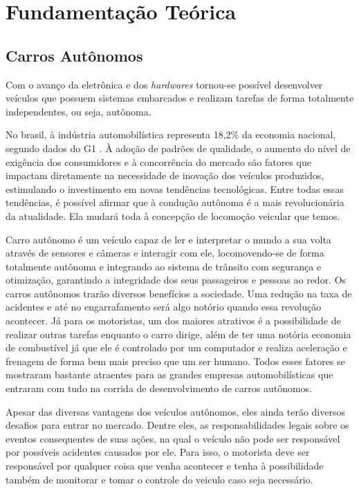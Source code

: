 \chapter{Fundamentação Teórica}
\label{cap:fundamentacao-teorica}

\section{Carros Autônomos}
\label{sec:carros autonomos}

Com o avanço da eletrônica e dos \textit{hardwares} tornou-se possível desenvolver veículos que possuem sistemas embarcados e realizam tarefas de forma totalmente independentes, ou seja, autônoma. \cite{rodrigues2017fundamentos}

No brasil, à indústria automobilística representa 18,2\% da economia nacional, segundo dados do G1 \cite{brasilutimorank}. À adoção de padrões de qualidade, o aumento do nível de exigência dos consumidores e à concorrência do mercado são fatores que impactam diretamente na necessidade de inovação dos veículos produzidos, estimulando o investimento em novas tendências tecnológicas. Entre todas essas tendências, é possível afirmar que à condução autônoma é a mais revolucionária da atualidade. Ela mudará toda à concepção de locomoção veicular que temos. \cite{ rodrigues2017fundamentos}

Carro autônomo é um veículo capaz de ler e interpretar o mundo a sua volta através de sensores e câmeras e interagir com ele, locomovendo-se de forma totalmente autônoma e integrando ao sistema de trânsito com segurança e otimização, garantindo a integridade dos seus passageiros e pessoas ao redor.
Os carros autônomos trarão diversos benefícios a sociedade. Uma redução na taxa de acidentes e até no engarrafamento será algo notório quando essa revolução acontecer. Já para os motoristas, um dos maiores atrativos é a possibilidade de realizar outras tarefas enquanto o carro dirige, além de ter uma notória economia de combustível já que ele é controlado por um computador e realiza aceleração e frenagem de forma bem mais preciso que um ser humano. Todos esses fatores se mostraram bastante atraentes para as grandes empresas automobilísticas que entraram com tudo na corrida de desenvolvimento de carros autônomos. \cite{inproceedings,rodrigues2017fundamentos}

Apesar das diversas vantagens dos veículos autônomos, eles ainda terão diversos desafios para entrar no mercado. Dentre eles, as responsabilidades legais sobre os eventos consequentes de suas ações, na qual o veículo não pode ser responsável por possíveis acidentes causados por ele. Para isso, o motorista deve ser responsável por qualquer coisa que venha acontecer e tenha à possibilidade também de monitorar e tomar o controle do veiculo caso seja necessário. \cite{inproceedings}

